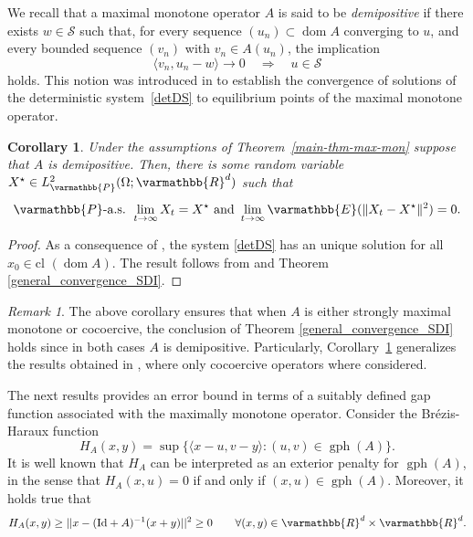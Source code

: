 \documentclass[11pt,reqno]{article}
\let\mathbb=\varmathbb
\newcommand{\R}{\mathbb{R}}
\newcommand{\gph}{\operatorname{gph}}
\newcommand{\dom}{\operatorname{dom}}
\newcommand{\cl}{{\text{cl }}}
\newcommand{\1}{\mathds{1}}
\numberwithin{equation}{section}  %
\theoremstyle{plain}
\newtheorem{corollary}[theorem]{Corollary}
\theoremstyle{definition}
\theoremstyle{remark}
\newtheorem{remark}{Remark}
\numberwithin{theorem}{section}
\numberwithin{remark}{section}
\numberwithin{example}{section}
\begin{document}
We recall that a maximal monotone operator $A$ is said to be \emph{demipositive} if there exists
$w \in \mathcal{S}$ such that, for every sequence $(u_n) \subset \dom A$ converging to $u$, and every
bounded sequence $(v_n)$ with $v_n \in A(u_n)$, the implication
\begin{equation*}
    \langle v_n, u_n - w \rangle \to 0 
    \quad \Longrightarrow \quad 
    u \in \mathcal{S}
\end{equation*}
holds. This notion was introduced in \cite{MR377609} to establish the convergence of solutions of
the deterministic system~\eqref{detDS} to equilibrium points of the maximal monotone operator.


\begin{corollary}\label{cor-theo-conv-general}
    Under the assumptions of Theorem~\ref{main-thm-max-mon} suppose that  $A$ is demipositive. Then, there is some random variable $X^\star\in L^2_{\mathbb{P}}(\Omega;\R^d)$ such that 
    \begin{equation*}
        \mathbb{P}\text{-a.s. } \lim_{t\to \infty}X_t = X^\star \text{ and } \lim_{t\to \infty}\mathbb{E}(\|X_t-X^\star\|^2) = 0.
    \end{equation*}
\end{corollary}
\begin{proof}
    As a consequence of \cite[Corollary III.3.1]{MR348562}, the system \eqref{detDS} has an unique solution for all $x_0\in \cl(\dom A)$. The result follows from \cite[Theorem 6.3]{MR2731260} and Theorem \ref{general_convergence_SDI}.
\end{proof}
\begin{remark}
    The above corollary ensures that when $A$ is either strongly maximal monotone or cocoercive, the conclusion of Theorem \ref{general_convergence_SDI} holds since in both cases $A$ is demipositive. Particularly, Corollary~\ref{cor-theo-conv-general} generalizes the results obtained in \cite[Theorem 5.1 \& 5.2]{MR4989859}, where only cocoercive operators where considered.
\end{remark}
The next results provides an error bound in terms of a suitably defined gap function associated with the maximally monotone operator. Consider the Br\'{e}zis-Haraux function 
$$
H_{A}(x,y)=\sup\{\langle x-u,v-y\rangle :(u,v)\in\gph(A)\}.
$$
It is well known \cite{MR3729487} that $H_{A}$ can be interpreted as an exterior penalty for $\gph(A)$, in the sense that $H_{A}(x,u)=0$ if and only if $(x,u)\in \gph(A)$. Moreover, it holds true that 
$$
H_{A}(x,y)\geq||x-(\text{Id}+A)^{-1}(x+y)||^{2}\geq 0 \qquad\forall (x,y)\in\R^{d}\times\R^{d}. 
$$
\end{document}
